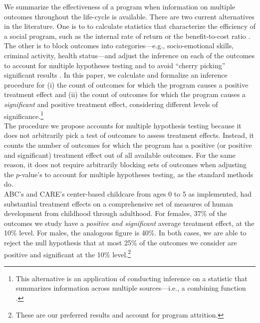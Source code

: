 \noindent We summarize the effectiveness of a program when information on multiple outcomes throughout the life-cycle is available. There are two current alternatives in the literature. One is to to calculate statistics that characterize the efficiency of a social program, such as the internal rate of return or the benefit-to-cost ratio \citep{Heckman_Moon_etal_2010_RateofReturn}. The other is to block outcomes into categories---e.g., socio-emotional skills, criminal activity, health status---and adjust the inference on each of the outcomes to account for multiple hypotheses testing and to avoid ``cherry picking'' significant results \citep{Lehman_Romano_2005_AnnStat,Lehmann_Romano_2005_testing,Heckman_Moon_etal_2010_QE}. In this paper, we calculate and formalize an inference procedure for (i) the count of outcomes for which the program causes a positive treatment effect and (ii) the count of outcomes for which the program causes a \emph{significant} and positive treatment effect, considering different levels of significance.\footnote{This alternative is an application of conducting inference on a statistic that summarizes information across multiple sources---i.e., a combining function \citep{Pesarin_Salmaso_2010_PermutationTests}.}\\

\noindent The procedure we propose accounts for multiple hypothesis testing because it does not arbitrarily pick a test of outcomes to assess treatment effects. Instead, it counts the number of outcomes for which the program has a positive (or positive and significant) treatment effect out of all available outcomes. For the same reason, it does not require arbitrarily blocking sets of outcomes when adjusting the $p$-value's to account for multiple hypotheses testing, as the standard methods do.\\

\noindent ABC's and CARE's center-based childcare from ages 0 to 5 as implemented, had substantial treatment effects on a comprehensive set of measures of human development from childhood through adulthood. For females, 37\% of the outcomes we study have a \textit{positive and significant} average treatment effect, at the 10\% level. For males, the analogous figure is 40\%. In both cases, we are able to reject the null hypothesis that at most 25\% of the outcomes we consider are positive and significant at the 10\% level.\footnote{These are our preferred results and account for program attrition.}\\

